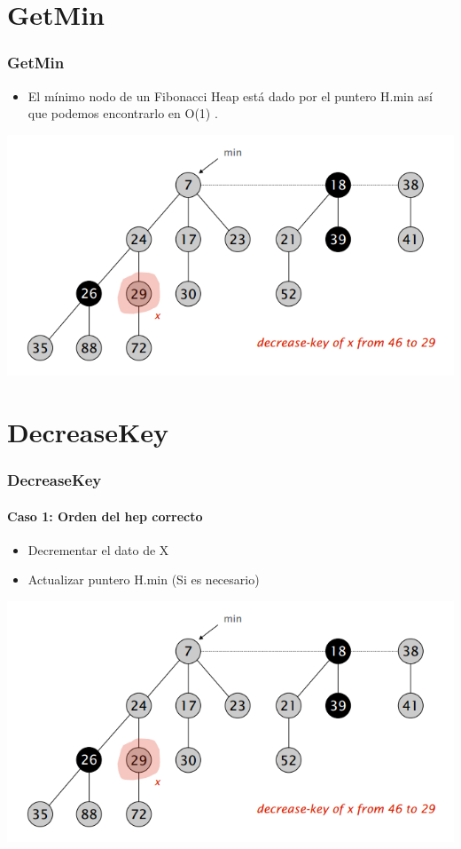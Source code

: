 \documentclass{beamer}
\begin{document}
\section{GetMin}
\begin{frame}
  \frametitle{GetMin}
  \begin{itemize}
    \item El mínimo nodo de un Fibonacci Heap está dado por el puntero H.min así que podemos encontrarlo en O(1) . 
  \end{itemize}
  
   \includegraphics[width =1 \textwidth]{img/decrease/01.png}

\end{frame}

\section{DecreaseKey}
\begin{frame}
  \frametitle{DecreaseKey}
  \framesubtitle{Caso 1: Orden del hep correcto}
  \begin{itemize}
    \item Decrementar el dato de X
    \item Actualizar puntero H.min (Si es necesario)

  \end{itemize}
  
   \includegraphics[width =1 \textwidth]{img/decrease/01.png}
\end{frame}
\end{document}

